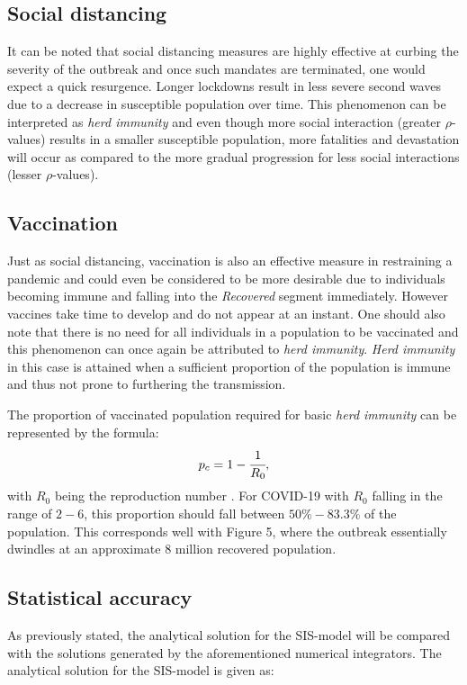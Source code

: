 \documentclass[12pt]{article}
\begin{document}
\newpage 

\subsection{Social distancing}
It can be noted that social distancing measures are highly effective at curbing the severity of the outbreak and once such mandates are terminated, one would expect a quick resurgence. Longer lockdowns result in less severe second waves due to a decrease in susceptible population over time. This phenomenon can be interpreted as \textit{herd immunity} and even though more social interaction (greater $\rho$-values) results in a smaller susceptible population, more fatalities and devastation will occur as compared to the more gradual progression for less social interactions (lesser $\rho$-values).
\subsection{Vaccination}
Just as social distancing, vaccination is also an effective measure in restraining a pandemic and could even be considered to be more desirable due to individuals becoming immune and falling into the \textit{Recovered} segment immediately. However vaccines take time to develop and do not appear at an instant. One should also note that there is no need for all individuals in a population to be vaccinated and this phenomenon can once again be attributed to \textit{herd immunity}. \textit{Herd immunity} in this case is attained when a sufficient proportion of the population is immune and thus not prone to furthering the transmission.

The proportion of vaccinated population required for basic \textit{herd immunity} can be represented by the formula: 
\begin{equation}
p_c = 1- \cfrac{1}{R_0},
\end{equation}
with $R_0$ being the reproduction number \cite{ashraf}. For COVID-19 with $R_0$ falling in the range of $2-6$, this proportion should fall between $50 \% - 83.3 \%$ of the population. This corresponds well with Figure 5, where the outbreak essentially dwindles at an approximate $8$ million recovered population. 
\newpage 
\subsection{Statistical accuracy}
As previously stated, the analytical solution for the SIS-model will be compared with the solutions generated by the aforementioned numerical integrators. The analytical solution for the SIS-model is given as:
\end{document}
